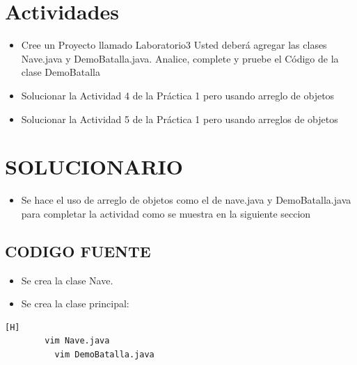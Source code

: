 \documentclass{article}
\begin{document}
	\section{Actividades}
	\begin{itemize}		
		\item Cree un Proyecto llamado Laboratorio3
Usted deberá agregar las clases Nave.java y DemoBatalla.java.
Analice, complete y pruebe el Código de la clase DemoBatalla
		\item Solucionar la Actividad 4 de la Práctica 1 pero usando arreglo de objetos
		\item Solucionar la Actividad 5 de la Práctica 1 pero usando arreglos de objetos
	\end{itemize}
		
	\section{SOLUCIONARIO}
	\begin{itemize}
		\item Se hace el uso de arreglo de objetos  como el de nave.java y DemoBatalla.java para completar la actividad como se muestra en la siguiente seccion
	\end{itemize}

	\subsection{CODIGO FUENTE}
	\begin{itemize}	
		\item Se crea la clase Nave.
		\item Se crea la clase principal:
	\end{itemize}	
		
	\begin{lstlisting}[language=bash,caption={Creando la clase Nave}][H]
		vim Nave.java
		  vim DemoBatalla.java
	\end{lstlisting}
	
\end{document}
